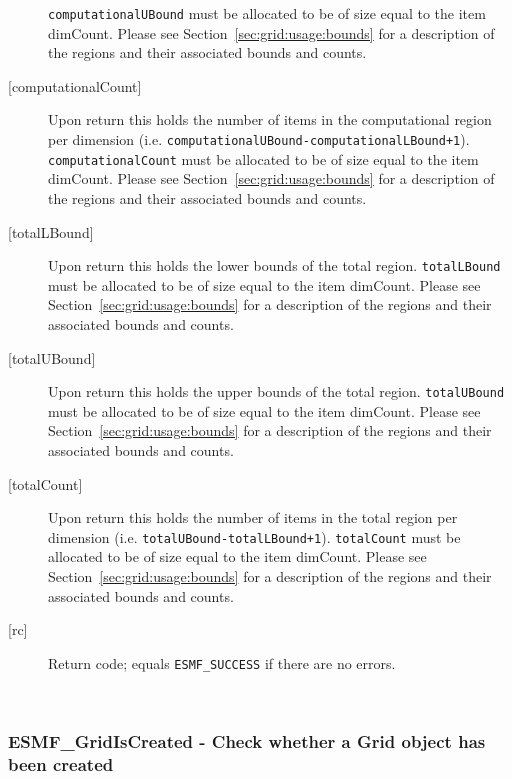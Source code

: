 \begin{description}
       {\tt computationalUBound} must be allocated to be of size equal to the item dimCount.
       Please see Section~\ref{sec:grid:usage:bounds} for a description
       of the regions and their associated bounds and counts.
  \item[{[computationalCount]}]
       Upon return this holds the number of items in the computational region per dimension
       (i.e. {\tt computationalUBound-computationalLBound+1}). {\tt computationalCount}
        must be allocated to be of size equal to the item dimCount.
       Please see Section~\ref{sec:grid:usage:bounds} for a description
       of the regions and their associated bounds and counts.
  \item[{[totalLBound]}]
       Upon return this holds the lower bounds of the total region.
       {\tt totalLBound} must be allocated to be of size equal to the item dimCount.
       Please see Section~\ref{sec:grid:usage:bounds} for a description
       of the regions and their associated bounds and counts.
  \item[{[totalUBound]}]
       Upon return this holds the upper bounds of the total region.
       {\tt totalUBound} must be allocated to be of size equal to the item dimCount.
       Please see Section~\ref{sec:grid:usage:bounds} for a description
       of the regions and their associated bounds and counts.
  \item[{[totalCount]}]
       \begin{sloppypar}
       Upon return this holds the number of items in the total region per dimension
       (i.e. {\tt totalUBound-totalLBound+1}). {\tt totalCount} must
        be allocated to be of size equal to the item dimCount.
       Please see Section~\ref{sec:grid:usage:bounds} for a description
       of the regions and their associated bounds and counts.
       \end{sloppypar}
  \item[{[rc]}]
       Return code; equals {\tt ESMF\_SUCCESS} if there are no errors.
  \end{description}
   
 
\mbox{}\hrulefill\ 
 
\subsubsection [ESMF\_GridIsCreated] {ESMF\_GridIsCreated - Check whether a Grid object has been created}


